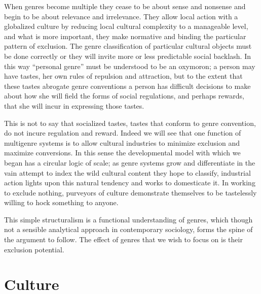 \documentclass[]{book}
\theoremstyle{definition}
\theoremstyle{definition}
\theoremstyle{definition}
\theoremstyle{remark}
\begin{document}
When genres become multiple they cease to be about sense and nonsense
and begin to be about relevance and irrelevance. They allow local action
with a globalized culture by reducing local cultural complexity to a
manageable level, and what is more important, they make normative and
binding the particular pattern of exclusion. The genre classification of
particular cultural objects must be done correctly or they will invite
more or less predictable social backlash. In this way ``personal genre''
must be understood to be an oxymoron; a person may have tastes, her own
rules of repulsion and attraction, but to the extent that these tastes
abrogate genre conventions a person has difficult decisions to make
about how she will field the forms of social regulations, and perhaps
rewards, that she will incur in expressing those tastes.

This is not to say that socialized tastes, tastes that conform to genre
convention, do not incure regulation and reward. Indeed we will see that
one function of multigenre systems is to allow cultural industries to
minimize exclusion and maximize conversions. In this sense the
developmental model with which we began has a circular logic of scale;
as genre systems grow and differentiate in the vain attempt to index the
wild cultural content they hope to classify, industrial action lights
upon this natural tendency and works to domesticate it. In working to
exclude nothing, purveyors of culture demonstrate themselves to be
tastelessly willing to hock something to anyone.

This simple structuralism is a functional understanding of genres, which
though not a sensible analytical approach in contemporary sociology,
forms the spine of the argument to follow. The effect of genres that we
wish to focus on is their exclusion potential.

\hypertarget{culture}{%
\section{Culture}\label{culture}}
\end{document}
